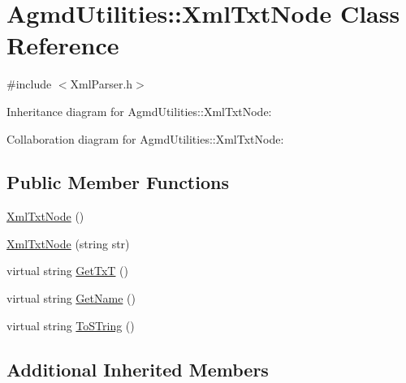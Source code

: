 \hypertarget{class_agmd_utilities_1_1_xml_txt_node}{\section{Agmd\+Utilities\+:\+:Xml\+Txt\+Node Class Reference}
\label{class_agmd_utilities_1_1_xml_txt_node}
}


{\ttfamily \#include $<$Xml\+Parser.\+h$>$}



Inheritance diagram for Agmd\+Utilities\+:\+:Xml\+Txt\+Node\+:


Collaboration diagram for Agmd\+Utilities\+:\+:Xml\+Txt\+Node\+:
\subsection*{Public Member Functions}
\begin{DoxyCompactItemize}
\item 
\hyperlink{class_agmd_utilities_1_1_xml_txt_node_ab27c8ee86e150b14665c522f788d525a}{Xml\+Txt\+Node} ()
\item 
\hyperlink{class_agmd_utilities_1_1_xml_txt_node_a4020d2fb33c9cd87f8fe96c263fb7f12}{Xml\+Txt\+Node} (string str)
\item 
virtual string \hyperlink{class_agmd_utilities_1_1_xml_txt_node_a2cd4e68ea1d0a364c88d9735fea44224}{Get\+Tx\+T} ()
\item 
virtual string \hyperlink{class_agmd_utilities_1_1_xml_txt_node_a6d28ed2a63ee2acb5d84deb0f52def6b}{Get\+Name} ()
\item 
virtual string \hyperlink{class_agmd_utilities_1_1_xml_txt_node_a30b8af526fdd3c74de577a9bab5c0580}{To\+S\+Tring} ()
\end{DoxyCompactItemize}
\subsection*{Additional Inherited Members}


